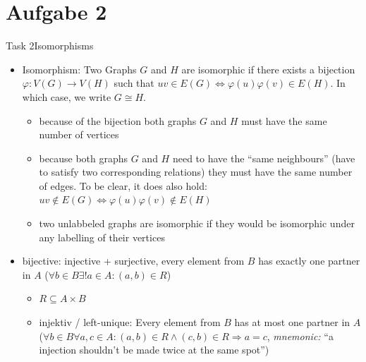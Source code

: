 
\section{Aufgabe 2}

\setcounter{task}{1}

\begin{frame}[allowframebreaks]{Task 2}{Isomorphisms}
  \begin{requirementsnoinc}
    \begin{itemize}
      \item \alert{Isomorphism:} Two Graphs $G$ and $H$ are \alert{isomorphic} if there exists a \alert{bijection} $\varphi: V(G) \to V(H)$ such that  $uv\in E(G) \Leftrightarrow \varphi(u)\varphi(v) \in E(H)$. In which case, we write $G\cong H$.
      \begin{itemize}
        \item because of the \alert{bijection} both graphs $G$ and $H$ must have the \alert{same number} of \alert{vertices}
        \item because both graphs $G$ and $H$ need to have the \alert{\enquote{same neighbours}} (have to satisfy two corresponding relations) they must have the \alert{same number} of \alert{edges}. To be clear, it does also hold: $uv\not\in E(G) \Leftrightarrow \varphi(u)\varphi(v)\not\in E(H)$
        \item two \alert{unlabbeled graphs} are isomorphic if they would be isomorphic under \alert{any} \alert{labelling} of their vertices
      \end{itemize} 
    \end{itemize}
  \end{requirementsnoinc}
  \begin{requirementsnoinc}
    \begin{itemize}
      \item \alert{bijective:} injective + surjective, every element from $B$ has \alert{exactly} one partner in $A$ ($\forall b \in B \exists ! a \in A:(a, b) \in R$)
      \begin{itemize}
        \item $R\subseteq A\times B$
        \item \alert{injektiv / left-unique:} Every element from $B$ has \alert{at most} one partner in $A$ ($\forall b \in B \forall a, c \in A:(a, b) \in R \wedge(c, b) \in R \Rightarrow a=c$, \textit{mnemonic:} \enquote{a injection shouldn't be made twice at the same spot})

\end{itemize}
\end{itemize}
\end{requirementsnoinc}
\end{frame}
